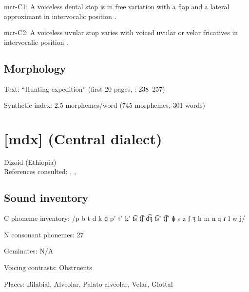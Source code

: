 {\begin{appendixdesc}
\item[mcr-C1:] A voiceless dental stop is in free variation with a flap and a lateral approximant in intervocalic position \citep[9]{Whitehead2004}.

\item[mcr-C2:] A voiceless uvular stop varies with voiced uvular or velar fricatives in intervocalic position \citep[9]{Whitehead2004}.
\end{appendixdesc}
\subsection*{Morphology}

\begin{appendixdesc}

\item[Text:] “Hunting expedition” (first 20 pages, \citealt{Whitehead2004}: 238--257)

\item[Synthetic index:] 2.5 morphemes/word (745 morphemes, 301 words)
\end{appendixdesc}
\newpage\section*{[mdx]  (Central dialect)}  %
Dizoid (Ethiopia)\medskip\\
References consulted: \citet{Allan1976}, \citet{Beachy2005}, \citet{Breeze1988}

\subsection*{Sound inventory}
\begin{appendixdesc}

\item[C phoneme inventory:] /p b t d k ɡ p’ t’ k’ t͡s t͡ʃ d͡ʒ t͡s’ t͡ʃ’ ɸ s z ʃ ʒ h m n ŋ ɾ l w j/

\item[N consonant phonemes:] 27

\item[Geminates:] N/A

\item[Voicing contrasts:] Obstruents

\item[Places:] Bilabial, Alveolar, Palato-alveolar, Velar, Glottal


\end{appendixdesc}}
